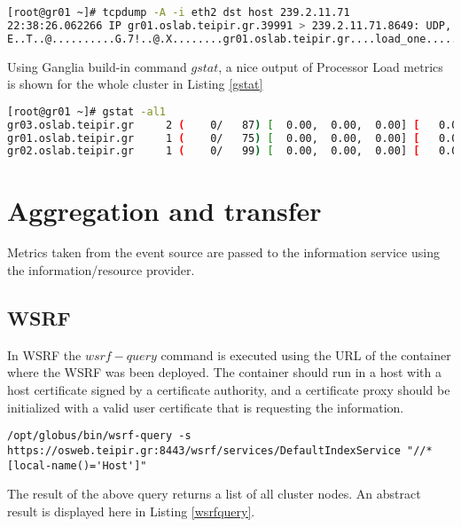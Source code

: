 \begin{lstlisting}[language=bash,caption=XDR sample]
[root@gr01 ~]# tcpdump -A -i eth2 dst host 239.2.11.71
22:38:26.062266 IP gr01.oslab.teipir.gr.39991 > 239.2.11.71.8649: UDP, length 56
E..T..@..........G.7!..@.X........gr01.oslab.teipir.gr....load_one........%.2f..
\end{lstlisting}

Using Ganglia build-in command $gstat$, a nice output of Processor Load metrics is shown for the whole cluster in Listing \ref{gstat}

\begin{lstlisting}[language=bash,caption=Gstat output,label=gstat]
[root@gr01 ~]# gstat -al1
gr03.oslab.teipir.gr     2 (    0/   87) [  0.00,  0.00,  0.00] [   0.0,   0.0,   0.0,  99.9,   0.1] OFF
gr01.oslab.teipir.gr     1 (    0/   75) [  0.00,  0.00,  0.00] [   0.0,   0.0,   0.0,  99.9,   0.0] OFF
gr02.oslab.teipir.gr     1 (    0/   99) [  0.00,  0.00,  0.00] [   0.0,   0.0,   0.1,  99.9,   0.0] OFF
\end{lstlisting}

\section{Aggregation and transfer}

Metrics taken from the event source are passed to the information service using the information/resource provider.

\subsection{WSRF}

In WSRF the $wsrf-query$ command is executed using the URL of the container where the WSRF was been deployed. The container should run in a host with a host certificate signed by a certificate authority, and a certificate proxy should be initialized with a valid user certificate that is requesting the information. 

\begin{lstlisting}
/opt/globus/bin/wsrf-query -s https://osweb.teipir.gr:8443/wsrf/services/DefaultIndexService "//*[local-name()='Host']"
\end{lstlisting}

The result of the above query returns a list of all cluster nodes. An abstract result is displayed here in Listing \ref{wsrfquery}.

